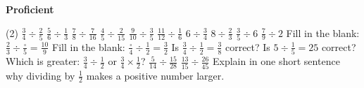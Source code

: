 \documentclass[17pt,a4paper,landscape]{extarticle}
\begin{document}
\sffamily
\boldmath

\boldmath

\vspace*{0.4em}
{\LARGE \textbf{Proficient}}
\begin{tasks}(2)
\task \mbox{$\frac{3}{4}\div\frac{2}{5}$}
\task \mbox{$\frac{5}{6}\div\frac{1}{3}$}
\task \mbox{$\frac{7}{8}\div\frac{7}{16}$}
\task \mbox{$\frac{4}{5}\div\frac{2}{15}$}
\task \mbox{$\frac{9}{10}\div\frac{3}{5}$}
\task \mbox{$\frac{11}{12}\div\frac{1}{6}$}
\task \mbox{$6\div\frac{3}{4}$}
\task \mbox{$8\div\frac{2}{3}$}
\task \mbox{$\frac{3}{5}\div 6$}
\task \mbox{$\frac{7}{9}\div 2$}
\task Fill in the blank: \mbox{$\frac{2}{3}\div\frac{\square}{5}=\frac{10}{9}$}
\task Fill in the blank: \mbox{$\frac{\square}{4}\div\frac{1}{2}=\frac{3}{2}$}
\task Is \mbox{$\frac{3}{4}\div\frac{1}{2}=\frac{3}{8}$} correct?
\task Is \mbox{$5\div\frac{1}{5}=25$} correct?
\task Which is greater: \mbox{$\frac{3}{4}\div\frac{1}{2}$} or \mbox{$\frac{3}{4}\times\frac{1}{2}$}?
\task \mbox{$\frac{5}{14}\div\frac{15}{28}$}
\task \mbox{$\frac{13}{15}\div\frac{26}{45}$}
\task Explain in one short sentence why dividing by \mbox{$\frac{1}{2}$} makes a positive number larger.
\end{tasks}
\end{document}
